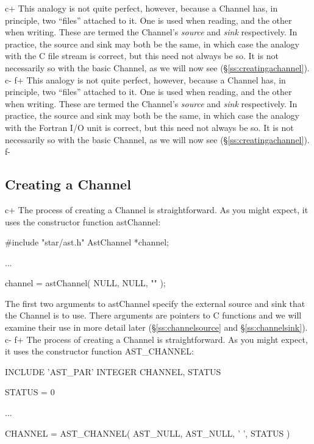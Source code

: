 \documentclass[twoside,11pt]{starlink}
\providecommand{\secref}[1]{\S\ref{#1}}
\begin{document}
{c+
This analogy is not quite perfect, however, because a Channel has, in
principle, two ``files'' attached to it. One is used when reading, and
the other when writing. These are termed the Channel's \emph{source}
and \emph{sink} respectively. In practice, the source and sink may
both be the same, in which case the analogy with the C file stream is
correct, but this need not always be so. It is not necessarily so with
the basic Channel, as we will now see (\secref{ss:creatingachannel}).
c-
f+
This analogy is not quite perfect, however, because a Channel has, in
principle, two ``files'' attached to it. One is used when reading, and
the other when writing. These are termed the Channel's \emph{source}
and \emph{sink} respectively. In practice, the source and sink may
both be the same, in which case the analogy with the Fortran I/O unit
is correct, but this need not always be so. It is not necessarily so
with the basic Channel, as we will now see
(\secref{ss:creatingachannel}).
f-

\subsection{\label{ss:creatingachannel}Creating a Channel}

c+
The process of creating a Channel is straightforward. As you
might expect, it uses the constructor function astChannel:

\small
\begin{terminalv}
#include "star/ast.h"
AstChannel *channel;

...

channel = astChannel( NULL, NULL, "" );
\end{terminalv}
\normalsize

The first two arguments to astChannel specify the external source and
sink that the Channel is to use. There arguments are pointers to C
functions and we will examine their use in more detail later
(\secref{ss:channelsource} and \secref{ss:channelsink}).
c-
f+
The process of creating a Channel is straightforward. As you
might expect, it uses the constructor function AST\_CHANNEL:

\small
\begin{terminalv}
      INCLUDE 'AST_PAR'
      INTEGER CHANNEL, STATUS

      STATUS = 0

      ...

      CHANNEL = AST_CHANNEL( AST_NULL, AST_NULL, ' ', STATUS )
\end{terminalv}
\normalsize

}
\end{document}
